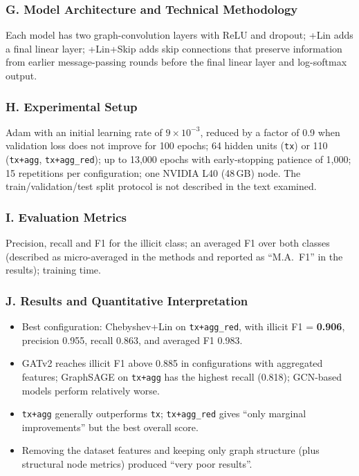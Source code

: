\documentclass[11pt,a4paper]{article}
\begin{document}
\subsubsection*{G. Model Architecture and Technical Methodology}
Each model has two graph-convolution layers with ReLU and dropout; +Lin adds a final linear layer; +Lin+Skip adds skip connections that preserve information from earlier message-passing rounds before the final linear layer and log-softmax output.

\subsubsection*{H. Experimental Setup}
Adam with an initial learning rate of $9\times10^{-3}$, reduced by a factor of 0.9 when validation loss does not improve for 100 epochs; 64 hidden units (\texttt{tx}) or 110 (\texttt{tx+agg}, \texttt{tx+agg\_red}); up to 13,000 epochs with early-stopping patience of 1,000; 15 repetitions per configuration; one NVIDIA L40 (48\,GB) node. The train/validation/test split protocol is not described in the text examined.

\subsubsection*{I. Evaluation Metrics}
Precision, recall and F1 for the illicit class; an averaged F1 over both classes (described as micro-averaged in the methods and reported as ``M.A.\ F1'' in the results); training time.

\subsubsection*{J. Results and Quantitative Interpretation}
\begin{itemize}[leftmargin=*]
    \item Best configuration: Chebyshev+Lin on \texttt{tx+agg\_red}, with illicit F1 = \textbf{0.906}, precision 0.955, recall 0.863, and averaged F1 0.983.
    \item GATv2 reaches illicit F1 above 0.885 in configurations with aggregated features; GraphSAGE on \texttt{tx+agg} has the highest recall (0.818); GCN-based models perform relatively worse.
    \item \texttt{tx+agg} generally outperforms \texttt{tx}; \texttt{tx+agg\_red} gives ``only marginal improvements'' but the best overall score.
    \item Removing the dataset features and keeping only graph structure (plus structural node metrics) produced ``very poor results''.
\end{itemize}
\end{document}
